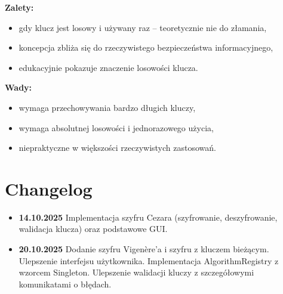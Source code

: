 \documentclass[12pt,a4paper]{article}
\begin{document}
\textbf{Zalety:}
\begin{itemize}
    \item gdy klucz jest losowy i używany raz -- teoretycznie nie do złamania,
    \item koncepcja zbliża się do rzeczywistego bezpieczeństwa informacyjnego,
    \item edukacyjnie pokazuje znaczenie losowości klucza.
\end{itemize}

\textbf{Wady:}
\begin{itemize}
    \item wymaga przechowywania bardzo długich kluczy,
    \item wymaga absolutnej losowości i jednorazowego użycia,
    \item niepraktyczne w większości rzeczywistych zastosowań.
\end{itemize}


\section{Changelog}
\label{sec:changelog}
\begin{itemize}
    \item \textbf{14.10.2025} Implementacja szyfru Cezara (szyfrowanie, deszyfrowanie, walidacja klucza) oraz podstawowe GUI.
    \item \textbf{20.10.2025} Dodanie szyfru Vigenère'a i szyfru z kluczem bieżącym. \newline Ulepszenie interfejsu użytkownika. \newline 
    Implementacja AlgorithmRegistry z wzorcem Singleton. 
    \newline Ulepszenie walidacji kluczy z szczegółowymi komunikatami o błędach.
\end{itemize}
\end{document}
